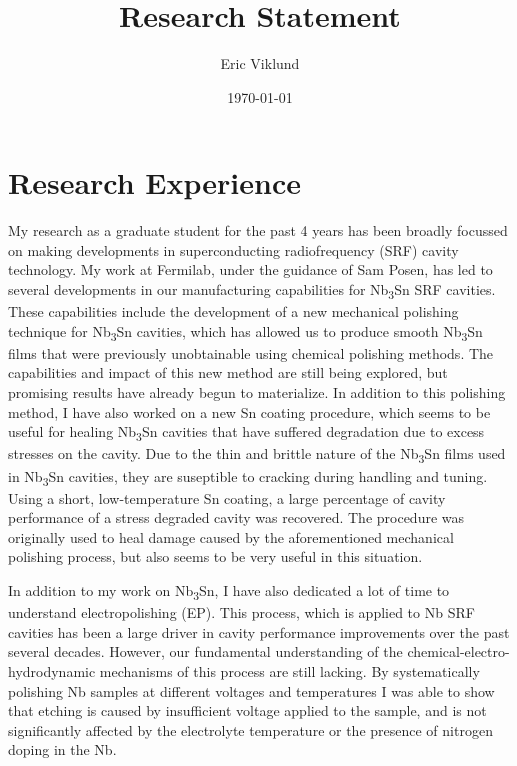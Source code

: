 \documentclass[]{revtex4-2}
\begin{document}
\title{Research Statement}
\author{Eric Viklund}


\date{\today}

\begin{abstract}



\end{abstract}

\maketitle

\section{Research Experience}

    My research as a graduate student for the past 4 years has been broadly focussed on making  developments in superconducting radiofrequency (SRF) cavity technology. My work at Fermilab, under the guidance of Sam Posen, has led to several developments in our manufacturing capabilities for Nb\textsubscript{3}Sn SRF cavities. These capabilities include the development of a new mechanical polishing technique for Nb\textsubscript{3}Sn cavities, which has allowed us to produce smooth Nb\textsubscript{3}Sn films that were previously unobtainable using chemical polishing methods.\cite{viklund2023improving} The capabilities and impact of this new method are still being explored, but promising results have already begun to materialize. In addition to this polishing method, I have also worked on a new Sn coating procedure, which seems to be useful for healing Nb\textsubscript{3}Sn cavities that have suffered degradation due to excess stresses on the cavity. Due to the thin and brittle nature of the Nb\textsubscript{3}Sn films used in Nb\textsubscript{3}Sn cavities, they are suseptible to cracking during handling and tuning. Using a short, low-temperature Sn coating, a large percentage of cavity performance of a stress degraded cavity was recovered. The procedure was originally used to heal damage caused by the aforementioned mechanical polishing process, but also seems to be very useful in this situation.

    In addition to my work on Nb\textsubscript{3}Sn, I have also dedicated a lot of time to understand electropolishing (EP). This process, which is applied to Nb SRF cavities has been a large driver in cavity performance improvements over the past several decades. However, our fundamental understanding of the chemical-electro-hydrodynamic mechanisms of this process are still lacking. By systematically polishing Nb samples at different voltages and temperatures I was able to show that etching is caused by insufficient voltage applied to the sample, and is not significantly affected by the electrolyte temperature or the presence of nitrogen doping in the Nb.\cite{viklund:srf2021-supcav016}
\end{document}
